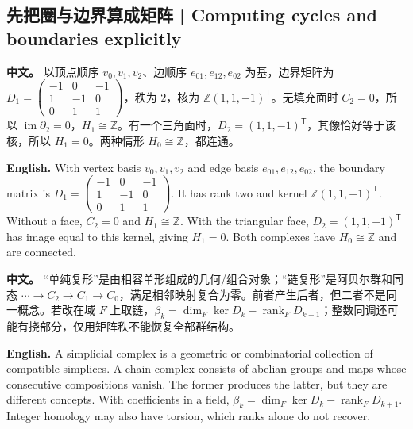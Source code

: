 \documentclass[UTF8,11pt,a4paper]{ctexart}
\newcommand{\APS}[2]{\par\noindent\textbf{中文。} #1\par\noindent\textbf{English.} #2\par\smallskip}
\begin{document}
\subsection{先把圈与边界算成矩阵 | Computing cycles and boundaries explicitly}
\APS{以顶点顺序 $v_0,v_1,v_2$、边顺序 $e_{01},e_{12},e_{02}$ 为基，边界矩阵为 $D_1=\left(\begin{smallmatrix}-1&0&-1\\1&-1&0\\0&1&1\end{smallmatrix}\right)$，秩为 $2$，核为 $\mathbb Z(1,1,-1)^{\mathsf T}$。无填充面时 $C_2=0$，所以 $\operatorname{im}\partial_2=0$，$H_1\cong\mathbb Z$。有一个三角面时，$D_2=(1,1,-1)^{\mathsf T}$，其像恰好等于该核，所以 $H_1=0$。两种情形 $H_0\cong\mathbb Z$，都连通。}{With vertex basis $v_0,v_1,v_2$ and edge basis $e_{01},e_{12},e_{02}$, the boundary matrix is $D_1=\left(\begin{smallmatrix}-1&0&-1\\1&-1&0\\0&1&1\end{smallmatrix}\right)$. It has rank two and kernel $\mathbb Z(1,1,-1)^{\mathsf T}$. Without a face, $C_2=0$ and $H_1\cong\mathbb Z$. With the triangular face, $D_2=(1,1,-1)^{\mathsf T}$ has image equal to this kernel, giving $H_1=0$. Both complexes have $H_0\cong\mathbb Z$ and are connected.}
\APS{“单纯复形”是由相容单形组成的几何/组合对象；“链复形”是阿贝尔群和同态 $\cdots\to C_2\to C_1\to C_0$，满足相邻映射复合为零。前者产生后者，但二者不是同一概念。若改在域 $F$ 上取链，$\beta_k=\dim_F\ker D_k-\operatorname{rank}_F D_{k+1}$；整数同调还可能有挠部分，仅用矩阵秩不能恢复全部群结构。}{A simplicial complex is a geometric or combinatorial collection of compatible simplices. A chain complex consists of abelian groups and maps whose consecutive compositions vanish. The former produces the latter, but they are different concepts. With coefficients in a field, $\beta_k=\dim_F\ker D_k-\operatorname{rank}_F D_{k+1}$. Integer homology may also have torsion, which ranks alone do not recover.}
\end{document}
